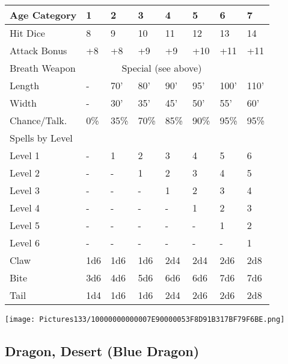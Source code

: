 \documentclass[a4paper,twoside,openany,10pt]{book}
\begin{document}
\begin{multicols}{2}
\begin{flushleft}
\begin{tabularx}{0.47\textwidth}{@{}lXXXXXXX@{}}
	Age Category & 1 & 2 & 3 & 4 & 5 & 6 & 7 \\\hline
	Hit Dice & 8 & 9 & 10 & 11 & 12 & 13 & 14 \\\hline
	Attack Bonus & +8 & +8 & +9 & +9 & +10 & +11 & +11 \\\hline
	Breath Weapon &  \multicolumn{6}{c}{Special (see above)}\\\hline
	Length & - & 70' & 80' & 	90' & 95' & 100' &	110' \\\hline
	Width & - & 30' & 35' & 	45' & 50' & 55' &	60' \\\hline
	Chance/Talk. & 0\% & 35\% & 70\% & 85\% & 90\% & 95\% & 95\% \\\hline
	Spells by Level & & & & & & & \\\hline
	Level 1 & - & 1 & 2 & 3 & 4 & 5 & 6 \\\hline
	Level 2 & - & - & 1 & 2 & 3 & 4 & 5 \\\hline
	Level 3 & - & - & - & 1 & 2 & 3 & 4 \\\hline
	Level 4 & - & - & - & - & 1 & 2 & 3 \\\hline
	Level 5 & - & - & - & - & - & 1 & 2 \\\hline
	Level 6 & - & - & - & - & - & - & 1 \\\hline
	Claw & 1d6 & 1d6 & 1d6 & 2d4 & 2d4 & 2d6 & 2d8 \\\hline
	Bite & 3d6 & 4d6 & 5d6 & 6d6 & 6d6 & 7d6 & 7d6 \\\hline
	Tail & 1d4 & 1d6 & 1d6 & 2d4 & 2d6 & 2d6 & 2d8 \\\hline
\end{tabularx}
\end{flushleft}

\vfill

\begin{center}
	\texttt{[image: Pictures133/10000000000007E90000053F8D91B317BF79F6BE.png]}
\end{center}

\pagebreak


\subsection*{Dragon, Desert (Blue Dragon)}\label{dragon-desert-blue-dragon}


\end{multicols}
\end{document}
